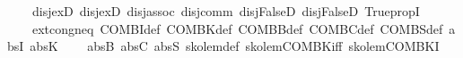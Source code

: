 \begin{isabellebody}
\ \ \ \ disj{\isacharunderscore}{\kern0pt}exD{}\ disj{\isacharunderscore}{\kern0pt}exD{}\ disj{\isacharunderscore}{\kern0pt}assoc\ disj{\isacharunderscore}{\kern0pt}comm\ disj{\isacharunderscore}{\kern0pt}FalseD{}\ disj{\isacharunderscore}{\kern0pt}FalseD{}\ TruepropI\isanewline
\ \ \ \ ext{\isacharunderscore}{\kern0pt}cong{\isacharunderscore}{\kern0pt}neq\ COMBI{\isacharunderscore}{\kern0pt}def\ COMBK{\isacharunderscore}{\kern0pt}def\ COMBB{\isacharunderscore}{\kern0pt}def\ COMBC{\isacharunderscore}{\kern0pt}def\ COMBS{\isacharunderscore}{\kern0pt}def\ abs{\isacharunderscore}{\kern0pt}I\ abs{\isacharunderscore}{\kern0pt}K\isanewline
\ \ \ \ abs{\isacharunderscore}{\kern0pt}B\ abs{\isacharunderscore}{\kern0pt}C\ abs{\isacharunderscore}{\kern0pt}S\ skolem{\isacharunderscore}{\kern0pt}def\ skolem{\isacharunderscore}{\kern0pt}COMBK{\isacharunderscore}{\kern0pt}iff\ skolem{\isacharunderscore}{\kern0pt}COMBK{\isacharunderscore}{\kern0pt}I\isanewline
%
\isadelimtheory
%
\endisadelimtheory
%
\isatagtheory
{}\isamarkupfalse%
%
\endisatagtheory
{\isafoldtheory}%
%
\isadelimtheory
%
\endisadelimtheory
%
\end{isabellebody}%
\endinput
